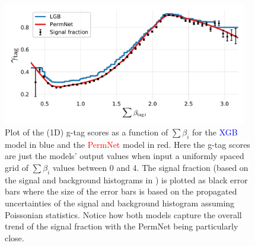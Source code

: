 \begin{figure}
  \includegraphics[width=0.95\textwidth, trim=10 10 10 20, clip]{figures/quarks/gtag_sum_models_njet=4-down_sample=1.00-ML_vars=vertex-selection=b-ejet_min=4-n_iter_RS_lgb=99-n_iter_RS_xgb=9-cdot_cut=0.90-version=19.pdf}
  \caption[1D Sum Models Predictions and Signal Fraction for 4-jets]
          {Plot of the (1D) g-tag scores as a function of $\sum \beta_i$ for the \textcolor{blue}{XGB} model in blue and the \textcolor{red}{PermNet} model in red. Here the g-tag scores are just the models' output values when input a uniformly spaced grid of $\sum \beta_i$ values between 0 and 4. The signal fraction (based on the signal and background histograms in ) is plotted as black error bars where the size of the error bars is based on the propagated uncertainties of the signal and background histogram assuming Poissonian statistics. Notice how both models capture the overall trend of the signal fraction with the PermNet being particularly close. 
          } 
  \label{fig:q:1d_sum_models_signal_fraction_4j}
\end{figure}








